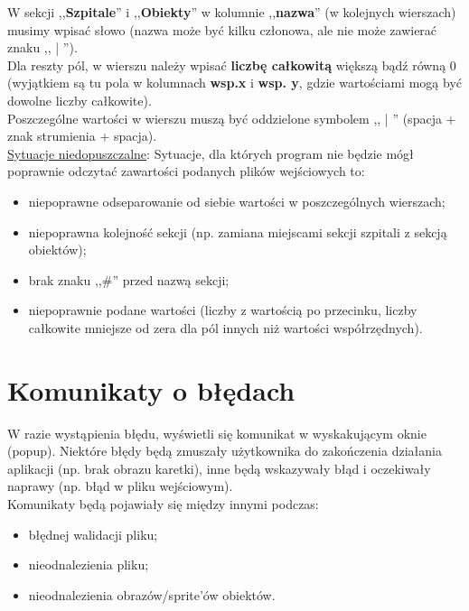 \documentclass{article}
\begin{document}
{W sekcji ,,\textbf{Szpitale}'' i ,,\textbf{Obiekty}'' w kolumnie ,,\textbf{nazwa}'' (w kolejnych wierszach) musimy wpisać słowo (nazwa może być kilku członowa, ale nie może zawierać znaku ,, | ''). \\ 

Dla reszty pól, w wierszu należy wpisać \textbf{liczbę całkowitą} większą bądź równą 0 (wyjątkiem są tu pola w kolumnach \textbf{wsp.x} i \textbf{wsp. y}, gdzie wartościami mogą być dowolne liczby całkowite). \\

Poszczególne wartości w wierszu muszą być oddzielone symbolem ,, | '' (spacja + znak strumienia + spacja). \\

\underline{Sytuacje niedopuszczalne}:
Sytuacje, dla których program nie będzie mógł poprawnie odczytać zawartości podanych plików wejściowych to:

\begin{itemize}
    \item niepoprawne odseparowanie od siebie wartości w poszczególnych wierszach;
    \item niepoprawna kolejność sekcji (np. zamiana miejscami sekcji szpitali z sekcją obiektów);
    \item brak znaku ,,\#'' przed nazwą sekcji;
    \item niepoprawnie podane wartości (liczby z wartością po przecinku, liczby całkowite mniejsze od zera dla pól innych niż wartości współrzędnych).
\end{itemize}

}

\clearpage

\section{Komunikaty o błędach}
{\fontsize{12}{12}\selectfont

W razie wystąpienia błędu, wyświetli się komunikat w wyskakującym oknie (popup). Niektóre błędy będą zmuszały użytkownika do zakończenia działania aplikacji (np. brak obrazu karetki), inne będą wskazywały błąd i oczekiwały naprawy (np. błąd w pliku wejściowym). \\
   
Komunikaty będą pojawiały się między innymi podczas:
   \begin{itemize}
        \item błędnej walidacji pliku;
        \item nieodnalezienia pliku;
        \item nieodnalezienia obrazów/sprite’ów obiektów.
   \end{itemize}
   
}
\end{document}
